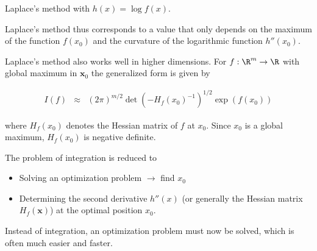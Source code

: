 \documentclass[11pt,compress,t,notes=noshow, xcolor=table]{beamer}
\begin{document}
\begin{vbframe}{Laplace's method}
with $h(x) = \log f(x)$.

\lz

Laplace's method thus corresponds to a value that only depends on the maximum of the function $f(x_0)$ and the curvature of the logarithmic function $h''(x_0)$.
\framebreak

Laplace's method also works well in higher dimensions. For $f:\R^{m} \to \R$ with global maximum in $\bm{x}_0$ the generalized form is given by

\begin{eqnarray*}
I(f) &\approx& (2\pi)^{m/2} \det(-H_f(x_0)^{-1})^{1/2} \exp(f(x_0))
\end{eqnarray*}

where $H_f(x_0)$ denotes the Hessian matrix of $f$ at $x_0$. Since $x_0$ is a global maximum, $H_f(x_0)$ is negative definite.

\lz

The problem of integration is reduced to

\begin{itemize}
\item Solving an optimization problem $\to$ find $x_0$
\item Determining the second derivative $h''(x)$ (or generally the Hessian matrix $H_f(\bm{x})$) at the optimal position $x_0$.
\end{itemize}

Instead of integration, an optimization problem must now be solved, which is often much easier and faster.



\end{vbframe}
\end{document}
